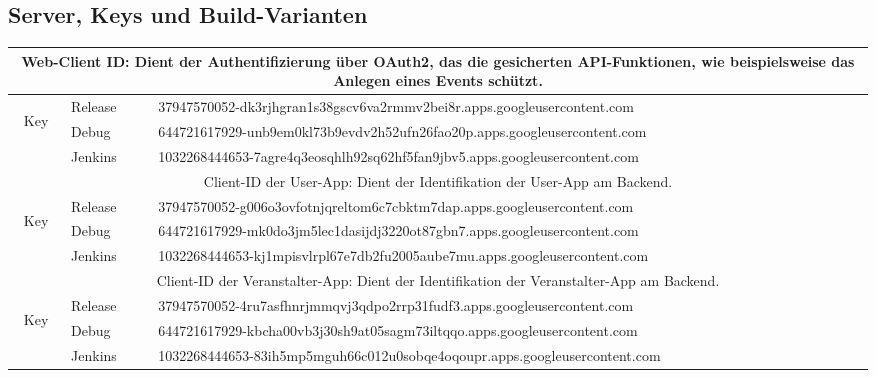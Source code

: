 \subsection{Server, Keys und Build-Varianten}
\begin{table}[htb]
	\begin{tabular}{|c|l|l|}
		\hline
		\multicolumn{3}{|p{15cm}|}{
			Web-Client ID: Dient der Authentifizierung über OAuth2, das die gesicherten API-Funktionen, wie beispielsweise das Anlegen eines Events schützt.
		} \\
		\hline
		\multirow{3}{3mm}{\begin{sideways}Key\end{sideways}} & Release & 37947570052-dk3rjhgran1s38gscv6va2rmmv2bei8r.apps.googleusercontent.com \\
		\cline{2-3}
		& Debug & 644721617929-unb9em0kl73b9evdv2h52ufn26fao20p.apps.googleusercontent.com \\
		\cline{2-3}
		& Jenkins & 1032268444653-7agre4q3eosqhlh92sq62hf5fan9jbv5.apps.googleusercontent.com \\
		\hline
		\hline
		\multicolumn{3}{|p{15cm}|}{
			Client-ID der User-App: Dient der Identifikation der User-App am Backend.
		} \\
		\hline
		\multirow{3}{3mm}{\begin{sideways}Key\end{sideways}} & Release & 37947570052-g006o3ovfotnjqreltom6c7cbktm7dap.apps.googleusercontent.com \\
		\cline{2-3}
		& Debug & 644721617929-mk0do3jm5lec1dasijdj3220ot87gbn7.apps.googleusercontent.com \\
		\cline{2-3}
		& Jenkins & 1032268444653-kj1mpisvlrpl67e7db2fu2005aube7mu.apps.googleusercontent.com \\
		\hline
		\hline
		\multicolumn{3}{|p{15cm}|}{
			Client-ID der Veranstalter-App: Dient der Identifikation der Veranstalter-App am Backend.
		} \\
		\hline
		\multirow{3}{3mm}{\begin{sideways}Key\end{sideways}} & Release & 37947570052-4ru7asfhnrjmmqvj3qdpo2rrp31fudf3.apps.googleusercontent.com \\
		\cline{2-3}
		& Debug & 644721617929-kbcha00vb3j30sh9at05sagm73iltqqo.apps.googleusercontent.com \\
		\cline{2-3}
		& Jenkins & 1032268444653-83ih5mp5mguh66c012u0sobqe4oqoupr.apps.googleusercontent.com \\

\end{tabular}
\end{table}

